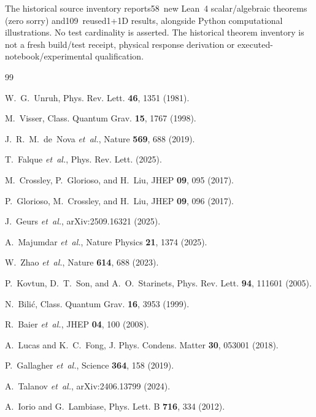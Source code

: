 \documentclass[aps,prd,twocolumn,showpacs,superscriptaddress,nofootinbib]{revtex4-2}
\begin{document}
\begin{acknowledgments}
The historical source inventory reports58~new Lean~4 scalar/algebraic
theorems (zero sorry) and109~reused1+1D results, alongside Python
computational illustrations. No test cardinality is asserted. The
historical theorem inventory is not a fresh build/test receipt, physical
response derivation or executed-notebook/experimental qualification.
\end{acknowledgments}

\begin{thebibliography}{99}

 W.~G.~Unruh, Phys. Rev. Lett. \textbf{46}, 1351 (1981).

 M.~Visser, Class. Quantum Grav. \textbf{15}, 1767 (1998).

 J.~R.~M.~de~Nova \textit{et~al.}, Nature \textbf{569}, 688 (2019).

 T.~Falque \textit{et~al.}, Phys. Rev. Lett. (2025).

 M.~Crossley, P.~Glorioso, and H.~Liu, JHEP \textbf{09}, 095 (2017).

 P.~Glorioso, M.~Crossley, and H.~Liu, JHEP \textbf{09}, 096 (2017).

 J.~Geurs \textit{et~al.}, arXiv:2509.16321 (2025).

 A.~Majumdar \textit{et~al.}, Nature Physics \textbf{21}, 1374 (2025).

 W.~Zhao \textit{et~al.}, Nature \textbf{614}, 688 (2023).

 P.~Kovtun, D.~T.~Son, and A.~O.~Starinets, Phys. Rev. Lett. \textbf{94}, 111601 (2005).

 N.~Bili\'{c}, Class. Quantum Grav. \textbf{16}, 3953 (1999).

 R.~Baier \textit{et~al.}, JHEP \textbf{04}, 100 (2008).

 A.~Lucas and K.~C.~Fong, J. Phys. Condens. Matter \textbf{30}, 053001 (2018).

 P.~Gallagher \textit{et~al.}, Science \textbf{364}, 158 (2019).

 A.~Talanov \textit{et~al.}, arXiv:2406.13799 (2024).

 A.~Iorio and G.~Lambiase, Phys. Lett. B \textbf{716}, 334 (2012).


\end{thebibliography}
\end{document}
